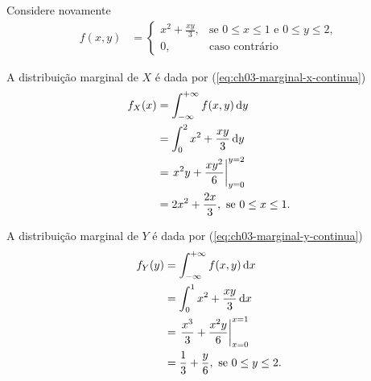 \begin{example}
    Considere novamente
    \begin{align*}
        f(x, y) &= \begin{cases}
            x^2 + \frac{xy}{3}, 
                &\text{se } 0 \leq x \leq 1 \text{ e } 0 \leq y \leq 2, \\
            0, &\text{caso contrário}
        \end{cases}
    \end{align*}

    A distribuição marginal de $X$ é dada por (\cref{eq:ch03-marginal-x-continua})
    \begin{align*}
        f_X(x) &= \int_{-\infty}^{+\infty} f(x, y) \,\mathrm{d} y \\
        &= \int_0^2 x^2 + \frac{xy}{3} \,\mathrm{d} y \\
        &= \left.x^2 y + \frac{xy^2}{6}\right|_{y=0}^{y=2} \\
        &= 2x^2 + \frac{2x}{3},\ \text{se } 0 \le x \le 1.
    \end{align*}

    \begin{center}
    \end{center}

    A distribuição marginal de $Y$ é dada por (\cref{eq:ch03-marginal-y-continua})
    \begin{align*}
        f_Y(y) &= \int_{-\infty}^{+\infty} f(x, y) \,\mathrm{d} x \\
        &= \int_0^1 x^2 + \frac{xy}{3} \,\mathrm{d} x \\
        &= \left. \frac{x^3}{3} + \frac{x^2 y}{6}\right|_{x=0}^{x=1} \\
        &= \frac{1}{3} + \frac{y}{6},\ \text{se } 0 \le y \le 2.
    \end{align*}


\end{example}
